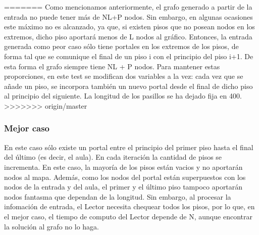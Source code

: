 =======
Como mencionamos anteriormente, el grafo generado a partir de la entrada no puede tener más de NL+P nodos. Sin embargo, en algunas ocasiones este máximo no es alcanzado, ya que, si existen pisos que no posean nodos en los extremos, dicho piso aportará menos de L nodos al gráfico. Entonces, la entrada generada como peor caso sólo tiene portales en los extremos de los pisos, de forma tal que se comunique el final de un piso i con el principio del piso i+1. De esta forma el grafo siempre tiene NL + P nodos. Para mantener estas proporciones, en este test se modifican dos variables a la vez: cada vez que se añade un piso, se incorpora también un nuevo portal desde el final de dicho piso al principio del siguiente. La longitud de los pasillos se ha dejado fija en 400.
>>>>>>> origin/master

\subsubsection{Mejor caso}
En este caso sólo existe un portal entre el principio del primer piso hasta el final del último (es decir, el aula). En cada iteración la cantidad de pisos se incrementa. En este caso, la mayoría de los pisos están vacios y no aportarán nodos al mapa. Además, como los nodos del portal están superpuestos con los nodos de la entrada y del aula, el primer y el último piso tampoco aportarán nodos fantasma que dependan de la longitud. Sin embargo, al procesar la infomación de entrada, el Lector necesita chequear todos los pisos, por lo que, en el mejor caso, el tiempo de computo del Lector depende de N, aunque encontrar la solución al grafo no lo haga.

\newpage
